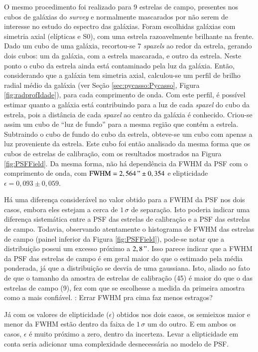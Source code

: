 O mesmo procedimento foi realizado para 9 estrelas de campo, presentes nos cubos
de galáxias do {\em survey} e normalmente mascarados por não serem de interesse
no estudo do espectro das galáxias. Foram escolhidas galáxias com simetria axial
(elípticas e S0), com uma estrela razoavelmente brilhante na frente.
Dado um cubo de uma galáxia, recortou-se 7 {\em spaxels} ao redor da estrela,
gerando dois cubos: um da galáxia, com a estrela mascarada, e outro da estrela.
Neste ponto o cubo da estrela ainda está contaminado pela luz da galáxia. Então,
considerando que a galáxia tem simetria axial, calculou-se um perfil de brilho
radial médio da galáxia (ver Seção \ref{sec:pycasso:Pycasso}, Figura
\ref{fig:radprofIdade}), para cada comprimento de onda. Com este perfil, é
possível estimar quanto a galáxia está contribuindo para a luz de cada {\em
spaxel} do cubo da estrela, pois a distância de cada {\em spaxel} ao centro da
galáxia é conhecido. Criou-se assim um cubo de ``luz de fundo'' para a mesma
região que contém a estrela. Subtraindo o cubo de fundo do cubo da estrela,
obteve-se um cubo com apenas a luz proveniente da estrela.
Este cubo foi então analisado da mesma forma que os cubos de estrelas de
calibração, com os resultados mostrados na Figura \ref{fig:PSFField}. Da mesma
forma, não há dependência da FWHM da PSF com o comprimento de onda, com
$\mathrm{FWHM}=2,564\," \pm 0,354$ e elipticidade $\epsilon=0,093 \pm 0,059$.

Há uma diferença considerável no valor obtido para a FWHM da PSF nos dois casos,
embora eles estejam a cerca de $1\,\sigma$ de separação. Isto poderia indicar
uma diferença sistemática entre a PSF das estrelas de calibração e a PSF das
estrelas de campo. Todavia, observando atentamente o histograma de FWHM das
estrelas de campo (painel inferior da Figura \ref{fig:PSFField}), pode-se notar
que a distribuição possui um excesso próximo a $2,8\,"$. Isso parece indicar que
a FWHM da PSF das estrelas de campo é em geral maior do que o estimado pela
média ponderada, já que a distribuição se desvia de uma gaussiana. Isto, aliado
ao fato de que o tamanho da amostra de estrelas de calibração (45) é maior do
que o das estrelas de campo (9), fez com que se escolhesse a medida da primeira
amostra como a mais confiável. \TODO: Errar FWHM pra cima faz menos estragos?

Já com os valores de elipticidade ($\epsilon$) obtidos nos dois casos, os
semieixos maior e menor da FWHM estão dentro da faixa de $1\,\sigma$ um do
outro. E em ambos os casos, $\epsilon$ é muito próximo a zero, dentro da
incerteza. Levar a elipticidade em conta seria adicionar uma complexidade
desnecessária ao modelo de PSF.

